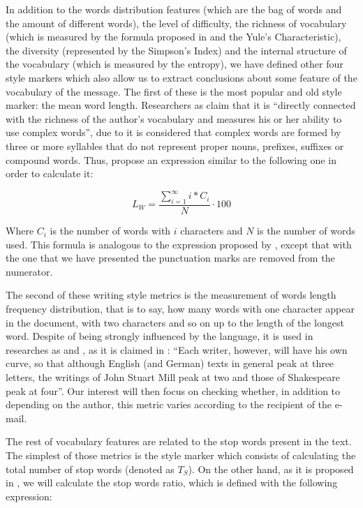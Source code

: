 In addition to the words distribution features (which are the bag of words and the amount of different words), the level of difficulty, the richness of vocabulary (which is measured by the formula proposed in \cite{honore1979some} and the Yule's Characteristic), the diversity (represented by the Simpson's Index) and the internal structure of the vocabulary (which is measured by the entropy), we have defined other four style markers which also allow us to extract conclusions about some feature of the vocabulary of the message. The first of these is the most popular and old style marker: the mean word length. Researchers as \cite{ril2014determination} claim that it is ``directly connected with the richness of the author's vocabulary and measures his or her ability to use complex words'', due to it is considered that complex words are formed by three or more syllables that do not represent proper nouns, prefixes, suffixes or compound words. Thus, \cite{ril2014determination} propose an expression similar to the following one in order to calculate it:

$$
L_W = \frac{\sum_{i=1}^{\infty}i*C_i}{N}\cdot 100
$$

Where $C_i$ is the number of words with $i$ characters and $N$ is the number of words used. This formula is analogous to the expression proposed by \cite{ril2014determination}, except that with the one that we have presented the punctuation marks are removed from the numerator.

The second of these writing style metrics is the measurement of words length frequency distribution, that is to say, how many words with one character appear in the document, with two characters and so on up to the length of the longest word. Despite of being strongly influenced by the language, it is used in researches as \cite{corney2001identifying} and \cite{kemp1976personal}, as it is claimed in \cite{allen1974methods}: ``Each writer, however, will have his own curve, so that although English (and German) texts in general peak at three letters, the writings of John Stuart Mill peak at two and those of Shakespeare peak at four''. Our interest will then focus on checking whether, in addition to depending on the author, this metric varies according to the recipient of the e-mail.

The rest of vocabulary features are related to the stop words present in the text. The simplest of those metrics is the style marker which consists of calculating the total number of stop words (denoted as $T_S$). On the other hand, as it is proposed in \cite{ril2014determination},  we will calculate the stop words ratio, which is defined with the following expression:


